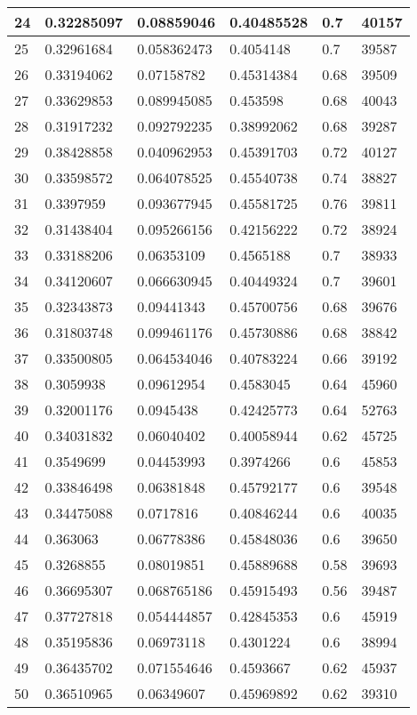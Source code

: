 \begin{longtable}{|l|l|l|l|l|l|}
24 & 0.32285097 & 0.08859046 & 0.40485528 & 0.7 & 40157 \\ \hline 
25 & 0.32961684 & 0.058362473 & 0.4054148 & 0.7 & 39587 \\ \hline 
26 & 0.33194062 & 0.07158782 & 0.45314384 & 0.68 & 39509 \\ \hline 
27 & 0.33629853 & 0.089945085 & 0.453598 & 0.68 & 40043 \\ \hline 
28 & 0.31917232 & 0.092792235 & 0.38992062 & 0.68 & 39287 \\ \hline 
29 & 0.38428858 & 0.040962953 & 0.45391703 & 0.72 & 40127 \\ \hline 
30 & 0.33598572 & 0.064078525 & 0.45540738 & 0.74 & 38827 \\ \hline 
31 & 0.3397959 & 0.093677945 & 0.45581725 & 0.76 & 39811 \\ \hline 
32 & 0.31438404 & 0.095266156 & 0.42156222 & 0.72 & 38924 \\ \hline 
33 & 0.33188206 & 0.06353109 & 0.4565188 & 0.7 & 38933 \\ \hline 
34 & 0.34120607 & 0.066630945 & 0.40449324 & 0.7 & 39601 \\ \hline 
35 & 0.32343873 & 0.09441343 & 0.45700756 & 0.68 & 39676 \\ \hline 
36 & 0.31803748 & 0.099461176 & 0.45730886 & 0.68 & 38842 \\ \hline 
37 & 0.33500805 & 0.064534046 & 0.40783224 & 0.66 & 39192 \\ \hline 
38 & 0.3059938 & 0.09612954 & 0.4583045 & 0.64 & 45960 \\ \hline 
39 & 0.32001176 & 0.0945438 & 0.42425773 & 0.64 & 52763 \\ \hline 
40 & 0.34031832 & 0.06040402 & 0.40058944 & 0.62 & 45725 \\ \hline 
41 & 0.3549699 & 0.04453993 & 0.3974266 & 0.6 & 45853 \\ \hline 
42 & 0.33846498 & 0.06381848 & 0.45792177 & 0.6 & 39548 \\ \hline 
43 & 0.34475088 & 0.0717816 & 0.40846244 & 0.6 & 40035 \\ \hline 
44 & 0.363063 & 0.06778386 & 0.45848036 & 0.6 & 39650 \\ \hline 
45 & 0.3268855 & 0.08019851 & 0.45889688 & 0.58 & 39693 \\ \hline 
46 & 0.36695307 & 0.068765186 & 0.45915493 & 0.56 & 39487 \\ \hline 
47 & 0.37727818 & 0.054444857 & 0.42845353 & 0.6 & 45919 \\ \hline 
48 & 0.35195836 & 0.06973118 & 0.4301224 & 0.6 & 38994 \\ \hline 
49 & 0.36435702 & 0.071554646 & 0.4593667 & 0.62 & 45937 \\ \hline 
50 & 0.36510965 & 0.06349607 & 0.45969892 & 0.62 & 39310 \\ \hline 
\end{longtable}